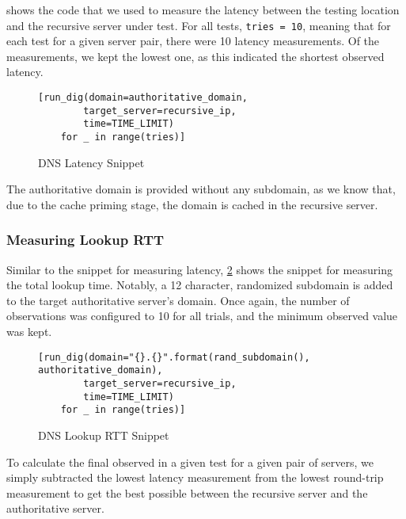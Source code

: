  shows the code that we used to measure the latency between the testing location and the recursive \dns server under test. For all tests, \texttt{tries = 10}, meaning that for each test for a given server pair, there were 10 latency measurements. Of the measurements, we kept the lowest one, as this indicated the shortest observed latency.

\begin{figure}[H]
\centering
    \begin{verbatim}
[run_dig(domain=authoritative_domain, 
        target_server=recursive_ip, 
        time=TIME_LIMIT) 
    for _ in range(tries)]
    \end{verbatim}
    \caption{DNS Latency Snippet}
    \label{fig:dns_latency_snippet}
\end{figure}

The authoritative domain is provided without any subdomain, as we know that, due to the cache priming stage, the domain is cached in the recursive server.

\subsubsection{Measuring Lookup RTT}

Similar to the snippet for measuring latency, \cref{fig:dns_lookup_rtt_snippet} shows the snippet for measuring the total lookup time. Notably, a 12 character, randomized subdomain is added to the target authoritative server's domain. Once again, the number of observations was configured to 10 for all trials, and the minimum observed value was kept.

\begin{figure}[H]
\centering
    \begin{verbatim}
[run_dig(domain="{}.{}".format(rand_subdomain(), authoritative_domain),
        target_server=recursive_ip, 
        time=TIME_LIMIT) 
    for _ in range(tries)]
    \end{verbatim}
    \caption{DNS Lookup RTT Snippet}
    \label{fig:dns_lookup_rtt_snippet}
\end{figure}

To calculate the final \rtt observed in a given test for a given pair of servers, we simply subtracted the lowest latency measurement from the lowest round-trip measurement to get the best possible \rtt between the recursive \dns server and the authoritative \dns server.